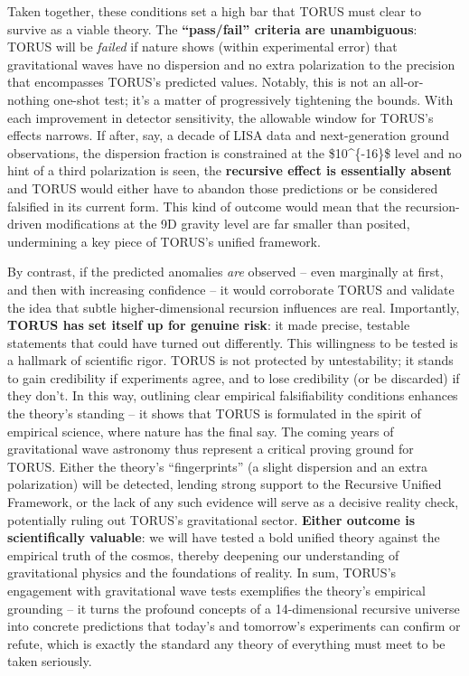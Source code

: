 Taken together, these conditions set a high bar that TORUS must clear to
survive as a viable theory. The \textbf{``pass/fail'' criteria are
unambiguous}: TORUS will be \emph{failed} if nature shows (within
experimental error) that gravitational waves have no dispersion and no
extra polarization to the precision that encompasses TORUS's predicted
values​. Notably, this is not an all-or-nothing one-shot test; it's a
matter of progressively tightening the bounds. With each improvement in
detector sensitivity, the allowable window for TORUS's effects narrows.
If after, say, a decade of LISA data and next-generation ground
observations, the dispersion fraction is constrained at the
\$10\^{}\{-16\}\$ level and no hint of a third polarization is seen, the
\textbf{recursive effect is essentially absent} and TORUS would either
have to abandon those predictions or be considered falsified in its
current form​. This kind of outcome would mean that the recursion-driven
modifications at the 9D gravity level are far smaller than posited,
undermining a key piece of TORUS's unified framework​.

By contrast, if the predicted anomalies \emph{are} observed -- even
marginally at first, and then with increasing confidence -- it would
corroborate TORUS and validate the idea that subtle higher-dimensional
recursion influences are real. Importantly, \textbf{TORUS has set itself
up for genuine risk}: it made precise, testable statements that could
have turned out differently. This willingness to be tested is a hallmark
of scientific rigor. TORUS is not protected by untestability; it stands
to gain credibility if experiments agree, and to lose credibility (or be
discarded) if they don't​. In this way, outlining clear empirical
falsifiability conditions enhances the theory's standing -- it shows
that TORUS is formulated in the spirit of empirical science, where
nature has the final say. The coming years of gravitational wave
astronomy thus represent a critical proving ground for TORUS. Either the
theory's ``fingerprints'' (a slight dispersion and an extra
polarization) will be detected, lending strong support to the Recursive
Unified Framework, or the lack of any such evidence will serve as a
decisive reality check, potentially ruling out TORUS's gravitational
sector. \textbf{Either outcome is scientifically valuable}: we will have
tested a bold unified theory against the empirical truth of the cosmos,
thereby deepening our understanding of gravitational physics and the
foundations of reality. In sum, TORUS's engagement with gravitational
wave tests exemplifies the theory's empirical grounding -- it turns the
profound concepts of a 14-dimensional recursive universe into concrete
predictions that today's and tomorrow's experiments can confirm or
refute, which is exactly the standard any theory of everything must meet
to be taken seriously.​

